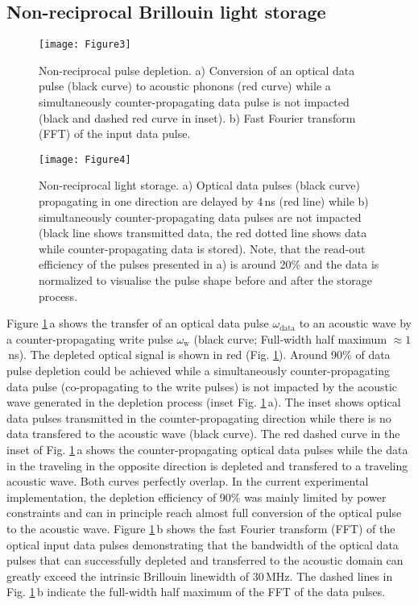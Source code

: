 \documentclass[superscriptaddress, nofootinbib, twocolumn, amsmath,amssymb, aps, pra, notitlepage, longbibliography]{revtex4-1}
\begin{document}
\subsection{Non-reciprocal Brillouin light storage}
%
\begin{figure}[b]
\centering
  \texttt{[image: Figure3]}
  \caption{Non-reciprocal pulse depletion. a) Conversion of an optical data pulse (black curve) to acoustic phonons (red curve) while a simultaneously counter-propagating data pulse is not impacted (black and dashed red curve in inset). b) Fast Fourier transform (FFT) of the input data pulse.}
\label{depl}
\end{figure}
\begin{figure*}[t]
\begin{center}
  \texttt{[image: Figure4]}
  \caption{Non-reciprocal light storage. a) Optical data pulses (black curve) propagating in one direction are delayed by 4\,ns (red line) while b) simultaneously counter-propagating data pulses are not impacted (black line shows transmitted data, the red dotted line shows data while counter-propagating data is stored). Note, that the read-out efficiency of the pulses presented in a) is around 20\% and the data is normalized to visualise the pulse shape before and after the storage process.}
\label{stor}
\end{center}
\end{figure*}
%
Figure \ref{depl}\,a shows the transfer of an optical data pulse \(\omega_{\mathrm{data}}\) to an acoustic wave by a counter-propagating write pulse \(\omega_{\mathrm{w}}\) (black curve; Full-width half maximum \(\approx 1\)\,ns). The depleted optical signal is shown in red (Fig. \ref{depl}). Around 90\% of data pulse depletion could be achieved while a simultaneously counter-propagating data pulse (co-propagating to the write pulses) is not impacted by the acoustic wave generated in the depletion process (inset Fig. \ref{depl}\,a). The inset shows optical data pulses transmitted in the counter-propagating direction while there is no data transfered to the acoustic wave (black curve). The red dashed curve in the inset of Fig. \ref{depl}\,a shows the counter-propagating optical data pulses while the data in the traveling in the opposite direction is depleted and transfered to a traveling acoustic wave. Both curves perfectly overlap. In the current experimental implementation, the depletion efficiency of 90\% was mainly limited by power constraints and can in principle reach almost full conversion of the optical pulse to the acoustic wave. Figure \ref{depl}\,b shows the fast Fourier transform (FFT) of the optical input data pulses demonstrating that the bandwidth of the optical data pulses that can successfully depleted and transferred to the acoustic domain can greatly exceed the intrinsic Brillouin linewidth of 30\,MHz. The dashed lines in Fig. \ref{depl}\,b indicate the full-width half maximum of the FFT of the data pulses. \newline
\end{document}
